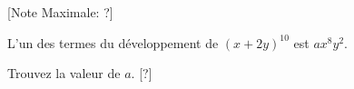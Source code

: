 \begin{question}
  \hspace*{\fill} [Note Maximale: ?]\par
  \medskip
  \noindent L'un des termes du développement de $(x + 2y)^{10}$ est $ax^8y^2$.\par
  \noindent Trouvez la valeur de $a$.\hspace*{\fill} [?]\par
\end{question}
